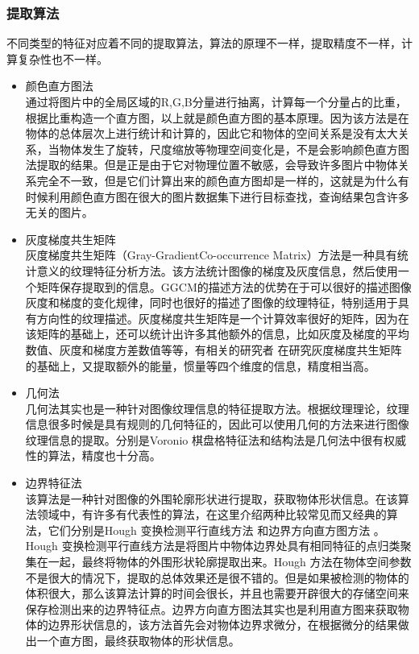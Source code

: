 \subsubsection{提取算法}
不同类型的特征对应着不同的提取算法，算法的原理不一样，提取精度不一样，计算复杂性也不一样。
\begin{itemize}
\item 颜色直方图法\\通过将图片中的全局区域的R,G,B分量进行抽离，计算每一个分量占的比重，根据比重构造一个直方图，以上就是颜色直方图的基本原理。因为该方法是在物体的总体层次上进行统计和计算的，因此它和物体的空间关系是没有太大关系，当物体发生了旋转，尺度缩放等物理空间变化是，不是会影响颜色直方图法提取的结果。但是正是由于它对物理位置不敏感，会导致许多图片中物体关系完全不一致，但是它们计算出来的颜色直方图却是一样的，这就是为什么有时候利用颜色直方图在很大的图片数据集下进行目标查找，查询结果包含许多无关的图片。
\item 灰度梯度共生矩阵\\ 灰度梯度共生矩阵（Gray-GradientCo-occurrence Matrix）方法是一种具有统计意义的纹理特征分析方法。该方法统计图像的梯度及灰度信息，然后使用一个矩阵保存提取到的信息。GGCM的描述方法的优势在于可以很好的描述图像灰度和梯度的变化规律，同时也很好的描述了图像的纹理特征，特别适用于具有方向性的纹理描述。灰度梯度共生矩阵是一个计算效率很好的矩阵，因为在该矩阵的基础上，还可以统计出许多其他额外的信息，比如灰度及梯度的平均数值、灰度和梯度方差数值等等，有相关的研究者 在研究灰度梯度共生矩阵的基础上，又提取额外的能量，惯量等四个维度的信息，精度相当高。
\item 几何法\\几何法其实也是一种针对图像纹理信息的特征提取方法。根据纹理理论，纹理信息很多时候是具有规则的几何特征的，因此可以使用几何的方法来进行图像纹理信息的提取。分别是Voronio 棋盘格特征法和结构法是几何法中很有权威性的算法，精度也十分高。
\item 边界特征法\\该算法是一种针对图像的外围轮廓形状进行提取，获取物体形状信息。在该算法领域中，有许多有代表性的算法，在这里介绍两种比较常见而又经典的算法，它们分别是Hough 变换检测平行直线方法 和边界方向直方图方法 。Hough 变换检测平行直线方法是将图片中物体边界处具有相同特征的点归类聚集在一起，最终将物体的外围形状轮廓提取出来。Hough 方法在物体空间参数不是很大的情况下，提取的总体效果还是很不错的。但是如果被检测的物体的体积很大，那么该算法计算的时间会很长，并且也需要开辟很大的存储空间来保存检测出来的边界特征点。边界方向直方图法其实也是利用直方图来获取物体的边界形状信息的，该方法首先会对物体边界求微分，在根据微分的结果做出一个直方图，最终获取物体的形状信息。

\end{itemize}
